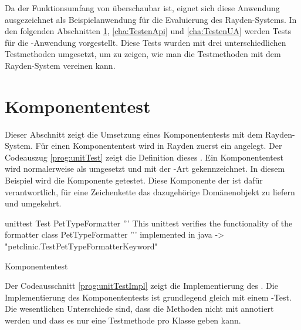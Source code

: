 \SuperPar
Da der Funktionsumfang von  überschaubar ist, eignet sich diese Anwendung ausgezeichnet als Beispielanwendung für die Evaluierung des Rayden-Systems. In den folgenden Abschnitten \ref{cha:TestenUnit}, \ref{cha:TestenApi} und \ref{cha:TestenUA} werden Tests für die -Anwendung vorgestellt. Diese Tests wurden mit drei unterschiedlichen Testmethoden umgesetzt, um zu zeigen, wie man die Testmethoden mit dem Rayden-System vereinen kann.

\section{Komponententest}
\label{cha:TestenUnit}

Dieser Abschnitt zeigt die Umsetzung eines Komponententests mit dem Rayden-System. Für einen Komponententest wird in Rayden zuerst ein  angelegt. Der Codeauszug \ref{prog:unitTest} zeigt die Definition dieses . Ein Komponententest wird normalerweise als  umgesetzt und mit der -Art  gekennzeichnet. In diesem Beispiel wird die Komponente  getestet. Diese Komponente der  ist dafür verantwortlich, für eine Zeichenkette das dazugehörige Domänenobjekt zu liefern und umgekehrt. 

\begin{program}
\begin{JavaCode}
unittest Test PetTypeFormatter {
	''' This unittest verifies the functionality of the 
	    formatter class PetTypeFormatter '''
	implemented in java -> "petclinic.TestPetTypeFormatterKeyword"
}
\end{JavaCode}
\caption{Komponententest }
\label{prog:unitTest}
\end{program}

\SuperPar
Der Codeausschnitt \ref{prog:unitTestImpl} zeigt die Implementierung des . Die Implementierung des Komponententests ist grundlegend gleich mit einem -Test. Die wesentlichen Unterschiede sind, dass die Methoden nicht mit  annotiert werden und dass es nur eine Testmethode pro Klasse geben kann. 

